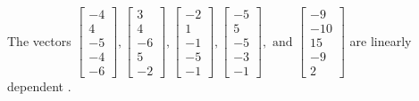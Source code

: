 \begin{exercise}
\begin{exerciseStatement}
  \end{exerciseStatement}
  \begin{exerciseAnswer}
   The vectors \(\left[\begin{array}{r}
-4 \\
4 \\
-5 \\
-4 \\
-6
\end{array}\right] , \left[\begin{array}{r}
3 \\
4 \\
-6 \\
5 \\
-2
\end{array}\right] , \left[\begin{array}{r}
-2 \\
1 \\
-1 \\
-5 \\
-1
\end{array}\right] , \left[\begin{array}{r}
-5 \\
5 \\
-5 \\
-3 \\
-1
\end{array}\right] , \text{ and } \left[\begin{array}{r}
-9 \\
-10 \\
15 \\
-9 \\
2
\end{array}\right]\) are 
  	 linearly dependent  .
  


  \end{exerciseAnswer}
\end{exercise}